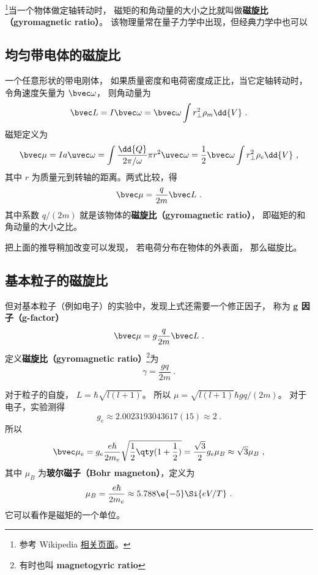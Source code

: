 


\footnote{参考 Wikipedia \href{https://en.wikipedia.org/wiki/Gyromagnetic_ratio}{相关页面}。}当一个物体做定轴转动时， 磁矩的和角动量的大小之比就叫做\textbf{磁旋比（gyromagnetic ratio）}。 该物理量常在量子力学中出现，但经典力学中也可以

\subsection{均匀带电体的磁旋比}
一个任意形状的带电刚体， 如果质量密度和电荷密度成正比，当它定轴转动时，令角速度矢量为 $\bvec\omega$， 则角动量为
\begin{equation}
\bvec L = I\bvec \omega  = \bvec \omega \int r_\bot^2 \rho_m \dd{V}~.
\end{equation}
磁矩定义为
\begin{equation}
\bvec \mu  = Ia \uvec\omega = \int \frac{\dd{Q}}{2\pi/\omega}  \pi r^2 \uvec \omega
= \frac12 \bvec \omega \int r_\bot^2\rho_e \dd{V} ~,
\end{equation}
其中 $r$ 为质量元到转轴的距离。两式比较，得
\begin{equation}
\bvec \mu  = \frac{q}{2m} \bvec L~.
\end{equation}
其中系数 $q/(2m)$ 就是该物体的\textbf{磁旋比（gyromagnetic ratio）}， 即磁矩的和角动量的大小之比。

把上面的推导稍加改变可以发现， 若电荷分布在物体的外表面， 那么磁旋比。

\subsection{基本粒子的磁旋比}
但对基本粒子（例如电子）的实验中，发现上式还需要一个修正因子， 称为 \textbf{g 因子（g-factor）}
\begin{equation}
\bvec \mu  = g\frac{q}{2m}\bvec L~.
\end{equation}
定义\textbf{磁旋比（gyromagnetic ratio）}\footnote{有时也叫 \textbf{magnetogyric ratio}}为
\begin{equation}
\gamma  = \frac{gq}{2m}~.
\end{equation}


对于粒子的自旋， $L = \hbar \sqrt{l(l + 1)} $。 所以 $\mu = \sqrt{l (l + 1)} \hbar gq/(2m)$。 
对于电子，实验测得
\begin{equation}
g_e \approx 2.0023193043617(15) \approx 2~.
\end{equation}
所以
\begin{equation}
\bvec \mu_e  = g_e \frac{e\hbar}{2 m_e} \sqrt{\frac12 \qty(1 + \frac12)}  = \frac{\sqrt 3}{2} g_e \mu_B \approx \sqrt 3 \mu_B~,
\end{equation}
其中 $\mu_B$ 为\textbf{玻尔磁子（Bohr magneton）}，定义为
\begin{equation}
\mu_B = \frac{e\hbar}{2 m_e} \approx 5.788\e{-5} \Si{eV/T}~.
\end{equation}
它可以看作是磁矩的一个单位。
